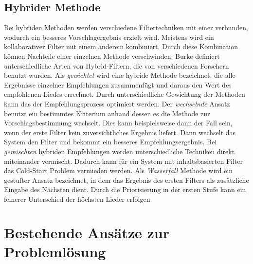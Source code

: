 \documentclass[twosided,a4,10pt]{article}
\begin{document}
\begin{multicols}{2}
\subsection{Hybrider Methode}
Bei hybriden Methoden werden verschiedene Filtertechniken mit einer verbunden, wodurch ein besseres Vorschlagergebnis erzielt wird. Meistens wird ein kollaborativer Filter mit einem anderem kombiniert. Durch diese Kombination können Nachteile einer einzelnen Methode verschwinden. \cite{burke}\newline
Burke \cite{burke} definiert unterschiedliche Arten von Hybrid-Filtern, die von verschiedenen Forschern benutzt wurden.\newline
Als \textit{gewichtet} wird eine hybride Methode bezeichnet, die alle Ergebnisse einzelner Empfehlungen zusammenfügt und daraus den Wert des empfohlenen Liedes errechnet. Durch unterschiedliche Gewichtung der Methoden kann das der Empfehlungsprozess optimiert werden. Der \textit{wechselnde} Ansatz benutzt ein bestimmtes Kriterium anhand dessen es die Methode zur Vorschlagsbestimmung wechselt. Dies kann beispielsweise dann der Fall sein, wenn der erste Filter kein zuversichtliches Ergebnis liefert. Dann wechselt das System den Filter und bekommt ein besseres Empfehlungsergebnis. Bei \textit{gemischten} hybriden Empfehlungen werden unterschiedliche Techniken direkt miteinander vermischt. Dadurch kann für ein System mit inhaltsbasierten Filter das Cold-Start Problem vermieden werden. Als \textit{Wasserfall} Methode wird ein gestufter Ansatz bezeichnet, in dem das Ergebnis des ersten Filters als zusätzliche Eingabe des Nächsten dient. Durch die Priorisierung in der ersten Stufe kann ein feinerer Unterschied der höchsten Lieder erfolgen.

\section{Bestehende Ansätze zur Problemlösung}




\end{multicols}
\end{document}
